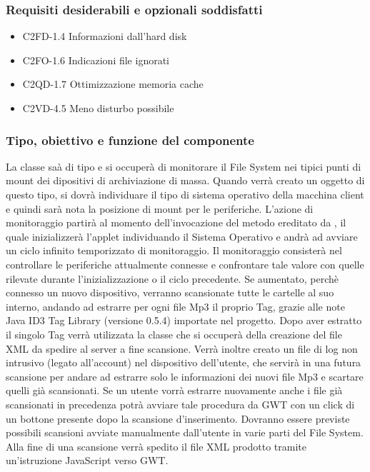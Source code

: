 \subsubsection*{Requisiti desiderabili e opzionali soddisfatti}
\begin{itemize}
   \item C2FD-1.4 Informazioni dall'hard disk
   \item C2FO-1.6 Indicazioni file ignorati
   \item C2QD-1.7 Ottimizzazione memoria cache
   \item C2VD-4.5 Meno disturbo possibile
\end{itemize}
\subsubsection*{Tipo, obiettivo e funzione del componente} La classe
 sa\`a di tipo  e si occuper\`a di monitorare il
File System nei tipici punti di mount dei dipositivi di archiviazione di massa.
Quando verr\`a creato un oggetto di questo tipo, si dovr\`a individuare il tipo
di sistema operativo della macchina client e quindi sar\`a nota la posizione di
mount per le periferiche. L'azione di monitoraggio partir\`a al momento
dell'invocazione del metodo  ereditato da , il quale
inizializzer\`a l'applet individuando il Sistema Operativo e andr\`a ad avviare
un ciclo infinito temporizzato di monitoraggio. Il monitoraggio consister\`a nel
controllare le periferiche attualmente connesse e confrontare tale valore con
quelle rilevate durante l'inizializzazione o il ciclo precedente. Se aumentato,
perch\`e connesso un nuovo dispositivo, verranno scansionate tutte le cartelle
al suo interno, andando ad estrarre per ogni file Mp3 il proprio Tag, grazie
alle note Java ID3 Tag Library (versione 0.5.4) importate nel progetto. Dopo
aver estratto il singolo Tag verr\`a utilizzata la classe  che
si occuper\`a della creazione del file XML da spedire al server a fine
scansione. Verr\`a inoltre creato un file di log non intrusivo (legato
all'account) nel dispositivo dell'utente, che servir\`a in una futura scansione
per andare ad estrarre solo le informazioni dei nuovi file Mp3 e scartare quelli
gi\`a scansionati. Se un utente vorr\`a estrarre nuovamente anche i file gi\`a
scansionati in precedenza potr\`a avviare tale procedura da GWT con un click di
un bottone presente dopo la scansione d'inserimento. Dovranno essere previste
possibili scansioni avviate manualmente dall'utente in varie parti del File
System. Alla fine di una scansione verr\`a spedito il file XML prodotto tramite
un'istruzione JavaScript verso GWT.


